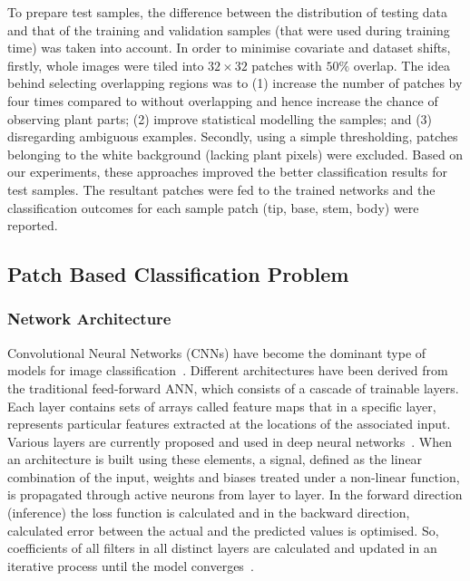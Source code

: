 \documentclass[a4paper,num-refs]{oup-contemporary}
\begin{document}
To prepare  test samples, the difference between the distribution of testing data and that of the training and validation samples (that were used during training time) was taken into account. 
In order to minimise  covariate  and dataset shifts,  firstly,  whole images were tiled into $32\times32$ patches with $50\%$ overlap. The idea behind selecting overlapping regions was to (1) increase the number of patches by four times compared to without overlapping and hence increase the chance of observing plant parts; (2) improve statistical  modelling the samples; and (3) disregarding ambiguous examples. Secondly, using a simple thresholding, patches belonging to the white background (lacking plant pixels) were excluded. Based on our experiments, these approaches improved the better classification results for test samples. The resultant patches were fed to the trained networks  and the classification outcomes for each sample patch (tip, base, stem, body) were reported. 

\subsection{Patch Based Classification Problem}

\subsubsection{Network Architecture}
\label{architecture}
Convolutional Neural Networks (CNNs) have become the dominant type of models for image classification~\cite{lecun2010convolutional}. Different architectures have been derived from the traditional feed-forward ANN, which consists of a cascade of trainable layers. Each layer contains sets of arrays called feature maps that in a specific layer, represents particular features extracted at the locations of the associated input.
Various layers are currently proposed and used in deep neural  networks~\cite{lecun2015deep,krizhevsky2012imagenet}. 
When an architecture is built using these elements, a signal, defined as the linear combination of the input, weights and biases treated under a non-linear function, is propagated through active neurons from layer to layer. In the forward direction (inference) the loss function is calculated and in the backward direction, calculated error between the actual and the predicted values is optimised. So, coefficients of all filters in all distinct layers are calculated and updated in an iterative process until the model converges~\cite{lecun2015deep}. 
\end{document}
